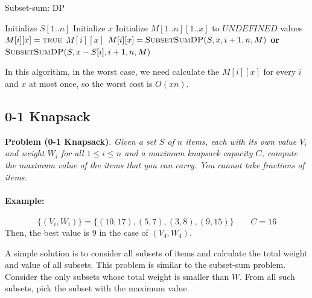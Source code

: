 \documentclass[11pt]{article}
\theoremstyle{definition}
\begin{document}
\begin{algorithm}[H]
\caption{Subset-sum: DP}\label{Subset-sum:DP}
\begin{algorithmic}[1]
\State Initialize $S[1..n]$
\State Initialize $x$
\State Initialize $M[1..n][1..x]$ to $UNDEFINED$ values
\State{}
\EndFunction
\State{\null}
\State {}
    \State\Return $M[i][x] = \Call{true}{}$
    \EndIf
    \State\Return {}
    \EndIf
    \State\Return $M[i][x]$
    \EndIf
    \State {}
    \Else 
    \State\Return $M[i][x]=\Call{SubsetSumDP}{S, x, i+1, n, M}$ {\bf or} $\Call{SubsetSumDP}{S, x-S[i], i+1, n, M}$
    \EndIf
\EndFunction
\end{algorithmic}
\end{algorithm}

In this algorithm, in the worst case, we need calculate the $M[i][x]$ for every $i$ and $x$ at most once, so the worst cost is $O(xn)$.
\subsection{0-1 Knapsack}
\textbf{Problem (0-1 Knapsack)}. \textit{Given a set $S$ of $n$ items, each with its own value $V_i$ and weight $W_i$ for all $1\leq i\leq n$ and a maximum knapsack capacity $C$, compute the maximum value of the items that you can carry. You cannot take fractions of items.}
\paragraph{Example:}
\[\{(V_i,W_i)\} = \{(10,17),(5,7),(3,8),(9,15)\}\qquad C = 16\]
Then, the best value is $9$ in the case of $(V_4,W_4)$.

A simple solution is to consider all subsets of items and calculate the total weight and value of all subsets. This problem is similar to the subset-sum problem. Consider the only subsets whose total weight is smaller than $W$. From all such subsets, pick the subset with the maximum value.
\end{document}
